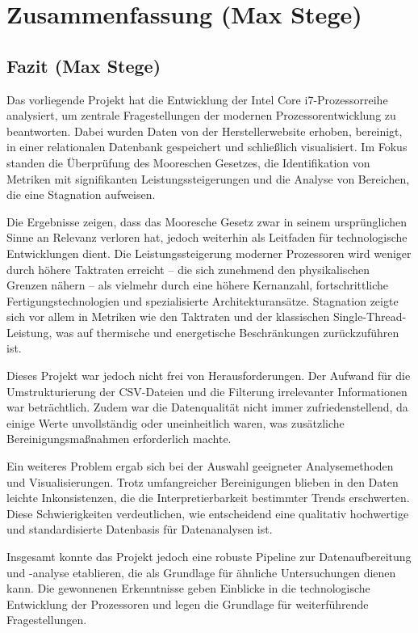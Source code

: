 \chapter{Zusammenfassung (Max Stege)}

\section{Fazit (Max Stege)}

Das vorliegende Projekt hat die Entwicklung der Intel Core i7-Prozessorreihe analysiert, um zentrale Fragestellungen der modernen Prozessorentwicklung zu beantworten. Dabei wurden Daten von der Herstellerwebsite erhoben, bereinigt, in einer relationalen Datenbank gespeichert und schließlich visualisiert. Im Fokus standen die Überprüfung des Mooreschen Gesetzes, die Identifikation von Metriken mit signifikanten Leistungssteigerungen und die Analyse von Bereichen, die eine Stagnation aufweisen.

Die Ergebnisse zeigen, dass das Mooresche Gesetz zwar in seinem ursprünglichen Sinne an Relevanz verloren hat, jedoch weiterhin als Leitfaden für technologische Entwicklungen dient. Die Leistungssteigerung moderner Prozessoren wird weniger durch höhere Taktraten erreicht – die sich zunehmend den physikalischen Grenzen nähern – als vielmehr durch eine höhere Kernanzahl, fortschrittliche Fertigungstechnologien und spezialisierte Architekturansätze. Stagnation zeigte sich vor allem in Metriken wie den Taktraten und der klassischen Single-Thread-Leistung, was auf thermische und energetische Beschränkungen zurückzuführen ist.

Dieses Projekt war jedoch nicht frei von Herausforderungen. Der Aufwand für die Umstrukturierung der CSV-Dateien und die Filterung irrelevanter Informationen war beträchtlich. Zudem war die Datenqualität nicht immer zufriedenstellend, da einige Werte unvollständig oder uneinheitlich waren, was zusätzliche Bereinigungsmaßnahmen erforderlich machte.

Ein weiteres Problem ergab sich bei der Auswahl geeigneter Analysemethoden und Visualisierungen. Trotz umfangreicher Bereinigungen blieben in den Daten leichte Inkonsistenzen, die die Interpretierbarkeit bestimmter Trends erschwerten. Diese Schwierigkeiten verdeutlichen, wie entscheidend eine qualitativ hochwertige und standardisierte Datenbasis für Datenanalysen ist.

Insgesamt konnte das Projekt jedoch eine robuste Pipeline zur Datenaufbereitung und -analyse etablieren, die als Grundlage für ähnliche Untersuchungen dienen kann. Die gewonnenen Erkenntnisse geben Einblicke in die technologische Entwicklung der Prozessoren und legen die Grundlage für weiterführende Fragestellungen.

